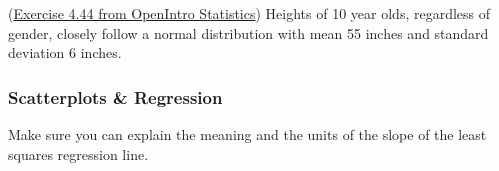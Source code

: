 \documentclass[12pt]{exam}
\newcounter{countA}
\begin{document}
\begin{questions}
\question (\href{http://people.hsc.edu/faculty-staff/blins/books/OpenIntroStats4e.pdf\#eoce.4.44}{Exercise 4.44 from OpenIntro Statistics}) Heights of 10 year olds, regardless of gender, closely follow a normal
distribution with mean 55 inches and standard deviation 6 inches.
\setcounter{countA}{\value{question}}
\end{questions}

\subsubsection*{Scatterplots \& Regression}

Make sure you can explain the meaning and the units of the slope of the least squares regression line.
\end{document}
